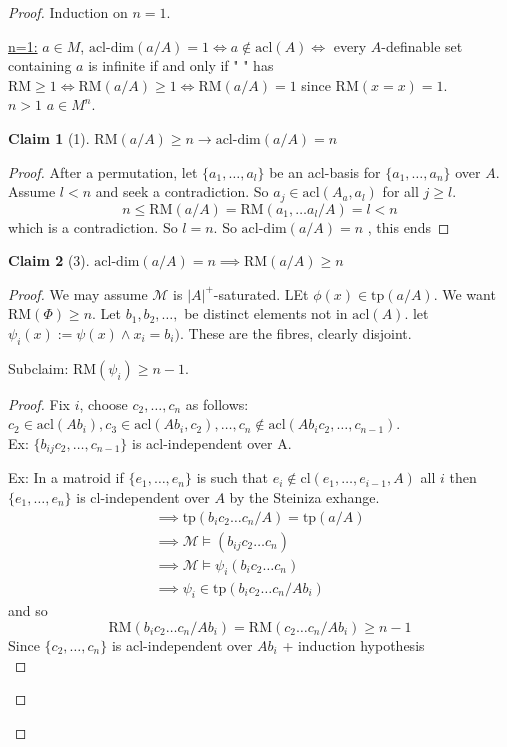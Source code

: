 \documentclass[letterpaper, 12pt]{article}
\newcommand{\cM}{\mathcal{M}}
\newcommand{\tp}{\mbox{tp}}
\newcommand{\RM}{\mbox{RM}}
\newcommand{\acl}{\mbox{acl}}
\newcommand{\cl}{\mbox{cl}}
\newcommand{\acldim}{\mbox{acl-dim}}
\theoremstyle{stdthm}
\theoremstyle{stddef}
\theoremstyle{stdnonum}
\newtheorem{claim}{Claim}
\theoremstyle{stdqands}
\theoremstyle{stdbold}
\begin{document}
\begin{proof}
Induction on $n = 1$. 

\underline{n=1:} $a \in M$, $\acldim(a/A) = 1 \iff a \notin \acl(A) \iff $ every $A$-definable set containing $a$ is infinite if and only if "   " has $\RM \geq 1 \iff \RM(a/A) \geq 1 \iff \RM(a/A) = 1$ since $\RM(x=x) = 1$. \\

\underline{$n>1$} $a \in M^n$. 

\begin{claim}[1]
 $\RM(a/A) \geq n \to \acldim(a/A) = n$
\end{claim}

\begin{proof}
After a permutation, let $\{a_1,\dots,a_l\}$ be an acl-basis for $\{a_1,\dots,a_n\}$ over $A$. Assume $l<n$ and seek a contradiction. So $a_j \in \acl(A_a,a_l)$ for all $j \geq l$. 
\[ n \leq \RM(a/A) = \RM(a_1,\dots a_l/A) = l < n \]
which is a contradiction. So $l=n$. So $\acldim(a/A) = n$ , this ends 
\end{proof}
 
 
\begin{claim}[3]
$\acldim(a/A) = n \implies \RM(a/A) \geq n$
\end{claim}

\begin{proof}
We may assume $\cM$ is $|A|^+$-saturated. LEt $\phi(x) \in \tp(a/A)$. We want $\RM(\Phi) \geq n$. Let $b_1,b_2,\dots,$ be distinct elements not in $\acl(A)$. let $\psi_i(x) := \psi(x) \wedge x_i = b_i)$. These are the fibres, clearly disjoint. 


Subclaim: $\RM(\psi_i) \geq n-1$. 
\begin{proof}
Fix $i$, choose $c_2,\dots, c_n$ as follows: $c_2 \in \acl(Ab_i), c_3 \in \acl(Ab_i, c_2),\dots, c_n \notin \acl(Ab_ic_2,\dots, c_{n-1})$. \\

Ex: $\{b_{ij}c_2,\dots,c_{n-1}\}$ is acl-independent over A. 

Ex: In a matroid if $\{e_1,\dots, e_n\}$ is such that $e_i \notin \cl(e_1,\dots,e_{i-1},A)$ all $i$ then $\{e_1,\dots,e_n\}$ is cl-independent over $A$ by the Steiniza exhange. 
\begin{align*}
\implies \tp(b_ic_2\dots c_n/A) = \tp(a/A) \\
\implies \cM \models (b_{ij}c_2\dots c_n) \\
\implies \cM \models \psi_i(b_ic_2\dots c_n) \\
\implies \psi_i \in \tp(b_i c_2 \dots c_n /Ab_i) 
\end{align*}
and so 
\[ \RM(b_i c_2 \dots c_n /Ab_i) = \RM(c_2\dots c_n /Ab_i) \geq n-1 \] 
Since $\{c_2,\dots, c_n\}$ is acl-independent over $Ab_i$ + induction hypothesis \\


\end{proof}
\end{proof}
\end{proof}
\end{document}
